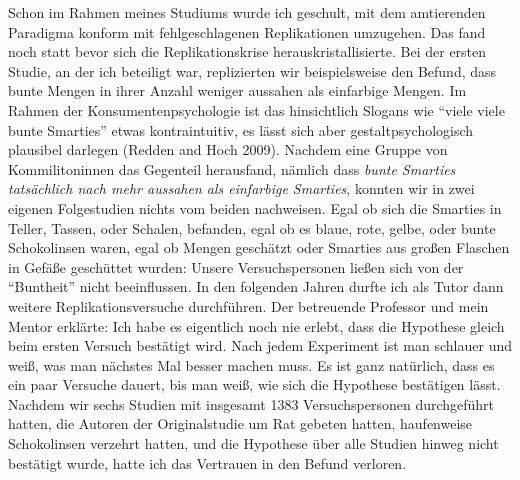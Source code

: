 \documentclass[
  letterpaper,
  DIV=11,
  numbers=noendperiod]{scrreprt}
\begin{document}
\begin{tcolorbox}[enhanced jigsaw, title=\textcolor{quarto-callout-tip-color}{\faLightbulb}\hspace{0.5em}{Beim ersten Versuch klappt es nie: Paradigmenwechsel in der Psychologie}, colbacktitle=quarto-callout-tip-color!10!white, rightrule=.15mm, titlerule=0mm, left=2mm, bottomrule=.15mm, arc=.35mm, leftrule=.75mm, toprule=.15mm, opacityback=0, breakable, bottomtitle=1mm, colframe=quarto-callout-tip-color-frame, toptitle=1mm, opacitybacktitle=0.6, coltitle=black, colback=white]

Schon im Rahmen meines Studiums wurde ich geschult, mit dem amtierenden
Paradigma konform mit fehlgeschlagenen Replikationen umzugehen. Das fand
noch statt bevor sich die Replikationskrise herauskristallisierte. Bei
der ersten Studie, an der ich beteiligt war, replizierten wir
beispielsweise den Befund, dass bunte Mengen in ihrer Anzahl weniger
aussahen als einfarbige Mengen. Im Rahmen der Konsumentenpsychologie ist
das hinsichtlich Slogans wie ``viele viele bunte Smarties'' etwas
kontraintuitiv, es lässt sich aber gestaltpsychologisch plausibel
darlegen (Redden and Hoch 2009). Nachdem eine Gruppe von Kommilitoninnen
das Gegenteil herausfand, nämlich dass \emph{bunte Smarties tatsächlich
nach mehr aussahen als einfarbige Smarties}, konnten wir in zwei eigenen
Folgestudien nichts vom beiden nachweisen. Egal ob sich die Smarties in
Teller, Tassen, oder Schalen, befanden, egal ob es blaue, rote, gelbe,
oder bunte Schokolinsen waren, egal ob Mengen geschätzt oder Smarties
aus großen Flaschen in Gefäße geschüttet wurden: Unsere Versuchspersonen
ließen sich von der ``Buntheit'' nicht beeinflussen. In den folgenden
Jahren durfte ich als Tutor dann weitere Replikationsversuche
durchführen. Der betreuende Professor und mein Mentor erklärte: Ich habe
es eigentlich noch nie erlebt, dass die Hypothese gleich beim ersten
Versuch bestätigt wird. Nach jedem Experiment ist man schlauer und weiß,
was man nächstes Mal besser machen muss. Es ist ganz natürlich, dass es
ein paar Versuche dauert, bis man weiß, wie sich die Hypothese
bestätigen lässt. Nachdem wir sechs Studien mit insgesamt 1383
Versuchspersonen durchgeführt hatten, die Autoren der Originalstudie um
Rat gebeten hatten, haufenweise Schokolinsen verzehrt hatten, und die
Hypothese über alle Studien hinweg nicht bestätigt wurde, hatte ich das
Vertrauen in den Befund verloren.


\end{tcolorbox}
\end{document}
